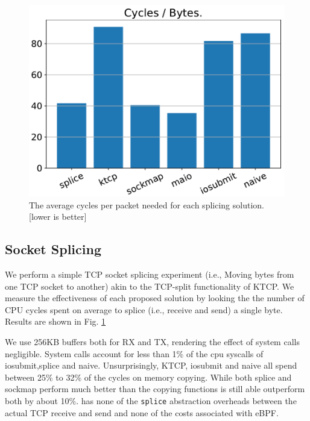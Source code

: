 \begin{figure}[t]
    \centering
    \includegraphics[width=\columnwidth]{splice.pdf}
    \caption{The average cycles per packet needed for each splicing solution. [lower is better]}
    \label{fig:cyc_byte}
\end{figure}

\subsection{Socket Splicing}
We perform a simple TCP socket splicing experiment (i.e., Moving bytes from one TCP socket to another) akin to the TCP-split functionality of KTCP. We measure the effectiveness of each proposed solution by looking the the number of CPU cycles spent on average to splice (i.e., receive and send) a single byte. Results are shown in Fig. \ref{fig:cyc_byte}

We use 256KB buffers both for RX and TX, rendering the effect of system calls negligible. System calls account for less than 1\% of the cpu syscalls of iosubmit,splice and naive. Unsurprisingly, KTCP, iosubmit and naive all spend between 25\% to 32\% of the cycles on memory copying. While both splice and sockmap perform much better than the copying functions \oursys is still able outperform both by about 10\%. \oursys has none of the \texttt{splice} abstraction overheads between the actual TCP receive and send and none of the costs associated with eBPF. 




